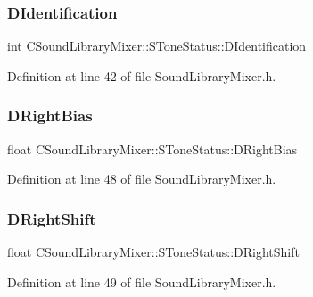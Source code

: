 \subsubsection{\texorpdfstring{D\+Identification}{DIdentification}}
{\footnotesize\ttfamily int C\+Sound\+Library\+Mixer\+::\+S\+Tone\+Status\+::\+D\+Identification}



Definition at line 42 of file Sound\+Library\+Mixer.\+h.

\hypertarget{structCSoundLibraryMixer_1_1SToneStatus_abb913d4ba795bfd4f1734138bc15018d}{}\label{structCSoundLibraryMixer_1_1SToneStatus_abb913d4ba795bfd4f1734138bc15018d} 
\subsubsection{\texorpdfstring{D\+Right\+Bias}{DRightBias}}
{\footnotesize\ttfamily float C\+Sound\+Library\+Mixer\+::\+S\+Tone\+Status\+::\+D\+Right\+Bias}



Definition at line 48 of file Sound\+Library\+Mixer.\+h.

\hypertarget{structCSoundLibraryMixer_1_1SToneStatus_ae7b7cfd4de145fc06d5a6e93e8ef75d3}{}\label{structCSoundLibraryMixer_1_1SToneStatus_ae7b7cfd4de145fc06d5a6e93e8ef75d3} 
\subsubsection{\texorpdfstring{D\+Right\+Shift}{DRightShift}}
{\footnotesize\ttfamily float C\+Sound\+Library\+Mixer\+::\+S\+Tone\+Status\+::\+D\+Right\+Shift}



Definition at line 49 of file Sound\+Library\+Mixer.\+h.

\hypertarget{structCSoundLibraryMixer_1_1SToneStatus_a95cb65bb95165b6ebaf236820ceefbc9}{}\label{structCSoundLibraryMixer_1_1SToneStatus_a95cb65bb95165b6ebaf236820ceefbc9} 

